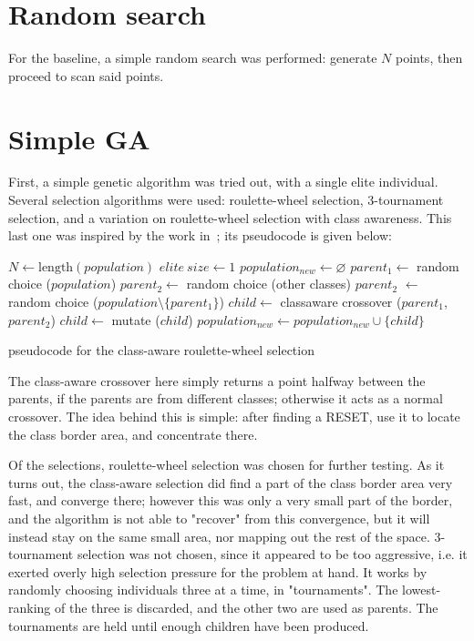 \documentclass[times, utf8, diplomski]{fer}
\begin{document}
\section{Random search}
For the baseline, a simple random search was performed: generate $N$ points,
then proceed to scan said points.

\section{Simple GA}
First, a simple genetic algorithm was tried out, with a single elite individual.
Several selection algorithms were used: roulette-wheel selection, 3-tournament
selection, and a variation on roulette-wheel selection with class awareness.
This last one was inspired by the work in~\cite{Picek?}; its pseudocode is given below:
\begin{algorithm}
    \small
    \begin{algorithmic}[1]
    \STATE $N \gets \text{length}(population)$
    \STATE $elite\ size \gets 1$
    \STATE $population_{new} \gets \varnothing$
        \STATE $parent_1  \gets$ random choice ($population$)
            \STATE $parent_2 \gets$ random choice (other classes)
        \ELSE
            \STATE $parent_2$ $\gets$ random choice ($population \setminus \{parent_1\}$)
        \ENDIF
        \STATE $child \gets$ classaware crossover ($parent_1$, $parent_2$)
        \STATE $child \gets$ mutate ($child$)
        \STATE $population_{new} \gets population_{new} \cup \{child\} $
    \ENDFOR
    \end{algorithmic}
    \caption{pseudocode for the class-aware roulette-wheel selection}
\end{algorithm}

The class-aware crossover here simply returns a point halfway between the parents,
if the parents are from different classes; otherwise it acts as a normal crossover.
The idea behind this is simple: after finding a RESET, use it to locate the class
border area, and concentrate there.

Of the selections, roulette-wheel selection was chosen for further testing.
As it turns out, the class-aware selection did find a part of the class border
area very fast, and converge there; however this was only a very small part of
the border, and the algorithm is not able to "recover" from this convergence,
but it will instead stay on the same small area, nor mapping out the rest of
the space.
3-tournament selection was not chosen, since it appeared to be too aggressive,
i.e. it exerted overly high selection pressure for the problem at hand.
It works by randomly choosing individuals three at a time, in "tournaments".
The lowest-ranking of the three is discarded, and the other two are used as
parents. The tournaments are held until enough children have been produced.
\end{document}
